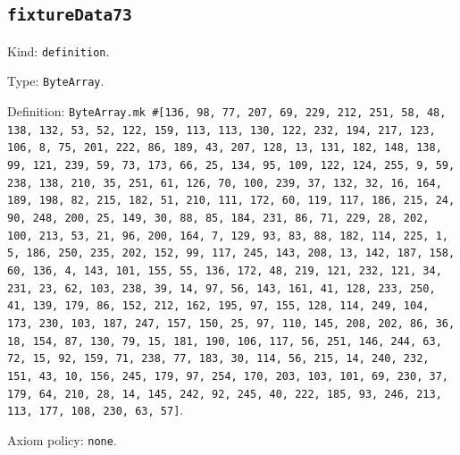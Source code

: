 \documentclass[11pt]{article}
\begin{document}
\subsection*{\texttt{fixtureData73}}
\noindent Kind: \texttt{definition}.\par
\noindent Type: \texttt{ByteArray}.\par
\noindent Definition: \texttt{ByteArray.mk \#[136, 98, 77, 207, 69, 229, 212, 251, 58, 48, 138, 132, 53, 52, 122, 159, 113, 113, 130, 122, 232, 194, 217, 123, 106, 8, 75, 201, 222, 86, 189, 43, 207, 128, 13, 131, 182, 148, 138, 99, 121, 239, 59, 73, 173, 66, 25, 134, 95, 109, 122, 124, 255, 9, 59, 238, 138, 210, 35, 251, 61, 126, 70, 100, 239, 37, 132, 32, 16, 164, 189, 198, 82, 215, 182, 51, 210, 111, 172, 60, 119, 117, 186, 215, 24, 90, 248, 200, 25, 149, 30, 88, 85, 184, 231, 86, 71, 229, 28, 202, 100, 213, 53, 21, 96, 200, 164, 7, 129, 93, 83, 88, 182, 114, 225, 1, 5, 186, 250, 235, 202, 152, 99, 117, 245, 143, 208, 13, 142, 187, 158, 60, 136, 4, 143, 101, 155, 55, 136, 172, 48, 219, 121, 232, 121, 34, 231, 23, 62, 103, 238, 39, 14, 97, 56, 143, 161, 41, 128, 233, 250, 41, 139, 179, 86, 152, 212, 162, 195, 97, 155, 128, 114, 249, 104, 173, 230, 103, 187, 247, 157, 150, 25, 97, 110, 145, 208, 202, 86, 36, 18, 154, 87, 130, 79, 15, 181, 190, 106, 117, 56, 251, 146, 244, 63, 72, 15, 92, 159, 71, 238, 77, 183, 30, 114, 56, 215, 14, 240, 232, 151, 43, 10, 156, 245, 179, 97, 254, 170, 203, 103, 101, 69, 230, 37, 179, 64, 210, 28, 14, 145, 242, 92, 245, 40, 222, 185, 93, 246, 213, 113, 177, 108, 230, 63, 57]}.\par
\noindent Axiom policy: \texttt{none}.\par
\end{document}
